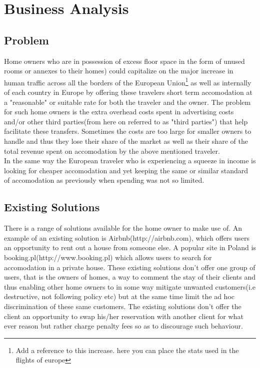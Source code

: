\chapter*{Business Analysis}
\section*{Problem}
Home owners who are in possession of excess floor space in the form of unused rooms or annexes to their homes) could capitalize on the major increase in human traffic across all the borders of the European Union\footnote{Add a reference to this increase. here you can place the stats used in the flights of europe} as well as internally of each country in Europe by offering these travelers short term accomodation at a "reasonable" or suitable rate for both the traveler and the owner. The problem for such home owners is the extra overhead costs spent in advertising costs and/or other third parties(from here on referred to as "third parties") that help facilitate these transfers. Sometimes the costs are too large for smaller owners to handle and thus they lose their share of the market as well as their share of the total revenue spent on accomodation by the above mentioned traveler.\\
In the same way the European traveler who is experiencing a squeeze in income is looking for cheaper accomodation and yet keeping the same or similar standard of accomodation as previously when spending was not so limited. 

\section*{Existing Solutions}
There is a range of solutions available for the home owner to make use of. An example of an existing solution is Airbnb(http://airbnb.com), which offers users an opportunity to rent out a house from someone else. A popular site in Poland is booking.pl(http://www.booking.pl) which allows users to search for accomodation in a private house. These existing solutions don't offer one group of users, that is the owners of homes, a way to comment the stay of their clients and thus enabling other home owners to in some way mitigate unwanted customers(i.e destructive, not following policy etc) but at the same time limit the ad hoc discrimination of these same customers. The existing solutions don't offer the client an opportunity to swap his/her reservation with another client for what ever reason but rather charge penalty fees so as to discourage such behaviour. 


